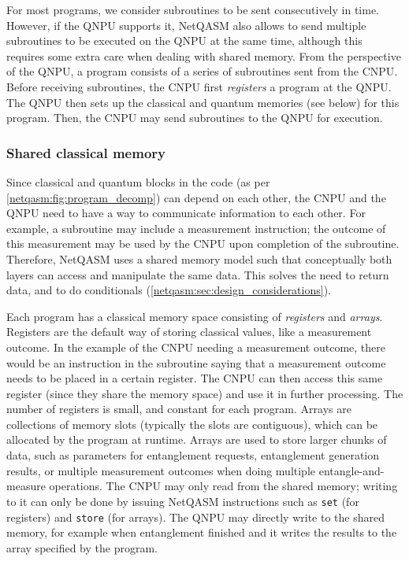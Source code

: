 For most programs, we consider subroutines to be sent consecutively in time.
However, if the \ac{QNPU} supports it, \ac{NetQASM} also allows to send multiple subroutines to be executed on the \ac{QNPU} at the same time, although this requires some extra care when dealing with shared memory.
From the perspective of the \ac{QNPU}, a program consists of a series of subroutines sent from the \ac{CNPU}.
Before receiving subroutines, the \ac{CNPU} first \textit{registers} a program at the \ac{QNPU}.
The \ac{QNPU} then sets up the classical and quantum memories (see below) for this program.
Then, the \ac{CNPU} may send subroutines to the \ac{QNPU} for execution.


\subsubsection{Shared classical memory}
Since classical and quantum blocks in the code (as per \cref{netqasm:fig:program_decomp}) can depend on each other, the \ac{CNPU} and the \ac{QNPU} need to have a way to communicate information to each other.
For example, a subroutine may include a measurement instruction; the outcome of this measurement may be used by the \ac{CNPU} upon completion of the subroutine.
Therefore, \ac{NetQASM} uses a shared memory model such that conceptually both layers can access and manipulate the same data. This solves the need to return data, and to do conditionals (\cref{netqasm:sec:design_considerations}).

Each program has a classical memory space consisting of \textit{registers} and \textit{arrays}.
Registers are the default way of storing classical values, like a measurement outcome.
In the example of the \ac{CNPU} needing a measurement outcome, there would be an instruction in the subroutine saying that a measurement outcome needs to be placed in a certain register.
The \ac{CNPU} can then access this same register (since they share the memory space) and use it in further processing.
The number of registers is small, and constant for each program.
Arrays are collections of memory slots (typically the slots are contiguous), which can be allocated by the program at runtime.
Arrays are used to store larger chunks of data, such as parameters for entanglement requests, entanglement generation results, or multiple measurement outcomes when doing multiple entangle-and-measure operations.
The \ac{CNPU} may only read from the shared memory; writing to it can only be done by issuing \ac{NetQASM} instructions such as \texttt{set} (for registers) and \texttt{store} (for arrays).
The \ac{QNPU} may directly write to the shared memory, for example when entanglement finished and it writes the results to the array specified by the program.


